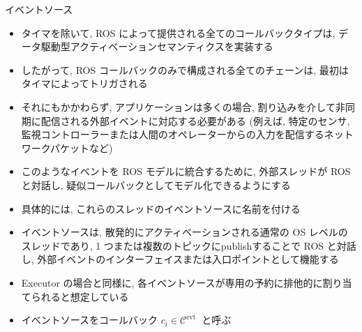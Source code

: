 \begin{frame}{イベントソース}
    \begin{itemize}
        \item タイマを除いて, ROS によって提供される全てのコールバックタイプは, データ駆動型アクティベーションセマンティクスを実装する
\item したがって, ROS コールバックのみで構成される全てのチェーンは, 最初はタイマによってトリガされる
\item それにもかかわらず, アプリケーションは多くの場合, 割り込みを介して非同期に配信される外部イベントに対応する必要がある (例えば, 特定のセンサ, 監視コントローラーまたは人間のオペレーターからの入力を配信するネットワークパケットなど)
\item このようなイベントを ROS モデルに統合するために, 外部スレッドが ROS と対話し, 疑似コールバックとしてモデル化できるようにする
\item 具体的には, これらのスレッドのイベントソースに名前を付ける
\item イベントソースは, 散発的にアクティベーションされる通常の OS レベルのスレッドであり, 1 つまたは複数のトピックにpublishすることで ROS と対話し, 外部イベントのインターフェイスまたは入口ポイントとして機能する
\item Executor の場合と同様に, 各イベントソースが専用の予約に排他的に割り当てられると想定している
\item イベントソースをコールバック $c_{i} \in \mathcal{C}^{\text {evt }}$ と呼ぶ
    \end{itemize}
\end{frame}
